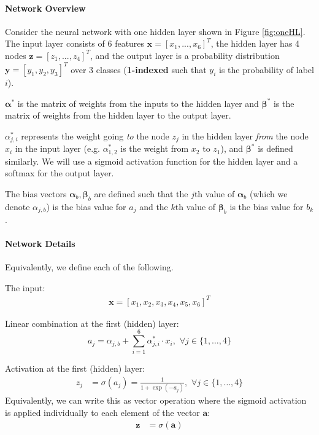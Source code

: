 \documentclass[11pt,addpoints,answers]{exam}
\newcommand{\av}{\mathbf{a}}
\newcommand{\xv}{\mathbf{x}}
\newcommand{\yv}{\mathbf{y}}
\newcommand{\zv}{\mathbf{z}}
\newcommand{\alphav     }{\boldsymbol \alpha     }
\newcommand{\betav      }{\boldsymbol \beta      }
\begin{document}
\begin{questions}
\paragraph{Network Overview}
Consider the neural network with one hidden layer shown in Figure \ref{fig:oneHL}. The input layer consists of 6 features $\xv = [x_1,...,x_6]^T$, the hidden layer has 4  nodes $\zv = [z_1,...,z_4]^T$, and the output layer is a probability distribution $\yv = [y_1, y_2, y_3]^T$ over 3 classes (\textbf{1-indexed} such that $y_i$ is the probability of label $i$).

$\alphav^*$ is the matrix of weights from the inputs to the hidden layer and $\betav^*$ is the matrix of weights from the hidden layer to the output layer. 

$\alpha^*_{j,i}$ represents the weight going \textit{to} the node $z_j$ in the hidden layer \textit{from} the node $x_i$ in the input layer (e.g. $\alpha^*_{1,2}$ is the weight from $x_2$ to $z_1$), and $\betav^*$ is defined similarly. We will use a sigmoid activation function for the hidden layer and a softmax for the output layer.

The bias vectors $\alphav_b, \betav_b$ are defined such that the $j$th value of $\alphav_b$ (which we denote $\alpha_{j, b}$) is the bias value for $a_j$ and the $k$th value of $\betav_b$ is the bias value for $b_k$.

\paragraph{Network Details}

Equivalently, we define each of the following. 

The input:
\begin{align}
\label{eqn:x}
\xv=[x_1,x_2,x_3,x_4,x_5,x_6]^T
\end{align}

Linear combination at the first (hidden) layer:
\begin{equation}
\label{eqn:a}
a_j= \alpha_{j, b} + \sum_{i=1}^6 \alpha^*_{j,i}\cdot x_i,\,\, \forall j \in \{1,\ldots,4\}
\end{equation}

Activation at the first (hidden) layer:
\begin{align}
\label{eqn:z}
z_j &= \sigma(a_j) = \frac{1}{1+\exp(-a_j)},\,\, \forall j \in \{1,\ldots,4\}
\end{align}
Equivalently, we can write this as vector operation where the sigmoid activation is applied individually to each element of the vector $\av$:
\begin{align}
\label{eqn:zv}
\zv &= \sigma(\av)
\end{align}


\end{questions}
\end{document}
